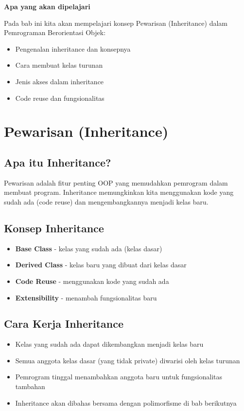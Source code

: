 \textbf{Apa yang akan dipelajari}

Pada bab ini kita akan mempelajari konsep Pewarisan (Inheritance) dalam Pemrograman Berorientasi Objek:

\begin{itemize}
\item Pengenalan inheritance dan konsepnya
\item Cara membuat kelas turunan
\item Jenis akses dalam inheritance
\item Code reuse dan fungsionalitas
\end{itemize}

\minitoc

\section{Pewarisan (Inheritance)}\label{pewarisan-inheritance}

\subsection{Apa itu Inheritance?}

Pewarisan adalah fitur penting OOP yang memudahkan pemrogram dalam membuat program. Inheritance memungkinkan kita menggunakan kode yang sudah ada (code reuse) dan mengembangkannya menjadi kelas baru.

\subsection{Konsep Inheritance}

\begin{itemize}
\item \textbf{Base Class} - kelas yang sudah ada (kelas dasar)
\item \textbf{Derived Class} - kelas baru yang dibuat dari kelas dasar
\item \textbf{Code Reuse} - menggunakan kode yang sudah ada
\item \textbf{Extensibility} - menambah fungsionalitas baru
\end{itemize}

\subsection{Cara Kerja Inheritance}

\begin{itemize}
\item Kelas yang sudah ada dapat dikembangkan menjadi kelas baru
\item Semua anggota kelas dasar (yang tidak private) diwarisi oleh kelas turunan
\item Pemrogram tinggal menambahkan anggota baru untuk fungsionalitas tambahan
\item Inheritance akan dibahas bersama dengan polimorfisme di bab berikutnya
\end{itemize}

